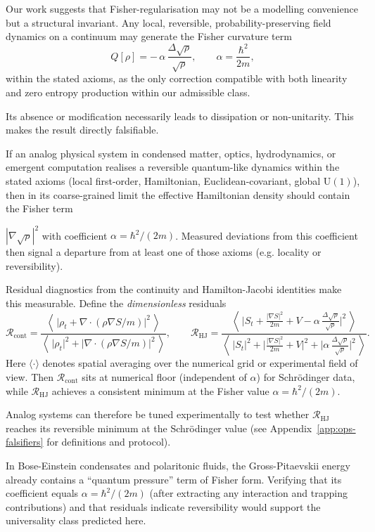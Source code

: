\documentclass[11pt,a4paper]{article}
\numberwithin{equation}{section}
\theoremstyle{thmcompact}
\theoremstyle{remark}
\begin{document}
	Our work suggests that Fisher-regularisation may not be a modelling convenience but a structural invariant.
Any local, reversible, probability-preserving field dynamics on a continuum may generate the Fisher curvature term
\[
Q[\rho] = -\,\alpha\,\frac{\Delta\sqrt{\rho}}{\sqrt{\rho}}, \qquad \alpha=\frac{\hbar^2}{2m},
\]
within the stated axioms, as the only correction compatible with both linearity and zero entropy production within our admissible class.

	Its absence or modification necessarily leads to dissipation or non-unitarity.
	This makes the result directly falsifiable.
	
If an analog physical system in condensed matter, optics, hydrodynamics, or emergent computation realises a reversible quantum-like dynamics within the stated axioms (local first-order, Hamiltonian, Euclidean-covariant, global $\mathrm{U}(1)
$), then in its coarse-grained limit the effective Hamiltonian density should contain the Fisher term

$|\nabla\sqrt\rho|^2$ with coefficient $\alpha=\hbar^2/(2m)$.
Measured deviations from this coefficient then signal a departure from at least one of those axioms (e.g. locality or reversibility).

Residual diagnostics from the continuity and Hamilton-Jacobi identities make this measurable. Define the \emph{dimensionless} residuals
\[
\mathcal{R}_{\mathrm{cont}}
=\frac{\left\langle\,\big|\rho_t + \nabla\!\cdot(\rho\nabla S/m)\big|^2\,\right\rangle}
{\left\langle\,\big|\rho_t\big|^2 + \big|\nabla\!\cdot(\rho\nabla S/m)\big|^2\,\right\rangle},
\qquad
\mathcal{R}_{\mathrm{HJ}}
=\frac{\left\langle\,\big|S_t + \tfrac{|\nabla S|^2}{2m} + V - \alpha\,\tfrac{\Delta\sqrt\rho}{\sqrt\rho}\big|^2\,\right\rangle}
{\left\langle\,\big|S_t\big|^2 + \big|\tfrac{|\nabla S|^2}{2m} + V\big|^2 + \big|\alpha\,\tfrac{\Delta\sqrt\rho}{\sqrt\rho}\big|^2\,\right\rangle}.
\]
Here $\langle\cdot\rangle$ denotes spatial averaging over the numerical grid or experimental field of view.
Then $\mathcal{R}_{\mathrm{cont}}$ sits at numerical floor (independent of $\alpha$) for Schrödinger data, while $\mathcal{R}_{\mathrm{HJ}}$
achieves a consistent minimum at the Fisher value $\alpha=\hbar^2/(2m)$.

Analog systems can therefore be tuned experimentally to test whether
$\mathcal{R}_{\mathrm{HJ}}$ reaches its reversible minimum at the
Schrödinger value (see Appendix~\ref{app:ops-falsifiers} for definitions and protocol).

	In Bose-Einstein condensates and polaritonic fluids, the Gross-Pitaevskii energy already contains a ``quantum pressure'' term of Fisher form.
	Verifying that its coefficient equals $\alpha=\hbar^{2}/(2m)$ (after extracting any interaction and trapping contributions) and that residuals indicate reversibility would support the universality class predicted here.
	
\end{document}
